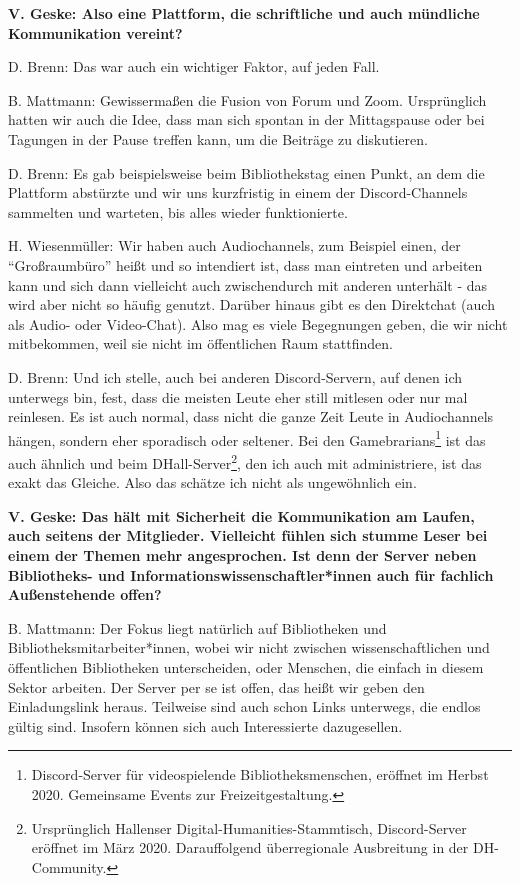 \documentclass[a4paper,
fontsize=11pt,
oneside,
numbers=noperiodatend,
parskip=half-,
bibliography=totoc,
final
]{scrartcl}
\begin{document}
\textbf{V. Geske: Also eine Plattform, die schriftliche und auch
mündliche Kommunikation vereint?}

D. Brenn: Das war auch ein wichtiger Faktor, auf jeden Fall.

B. Mattmann: Gewissermaßen die Fusion von Forum und Zoom. Ursprünglich
hatten wir auch die Idee, dass man sich spontan in der Mittagspause oder
bei Tagungen in der Pause treffen kann, um die Beiträge zu diskutieren.

D. Brenn: Es gab beispielsweise beim Bibliothekstag einen Punkt, an dem
die Plattform abstürzte und wir uns kurzfristig in einem der
Discord-Channels sammelten und warteten, bis alles wieder funktionierte.

H. Wiesenmüller: Wir haben auch Audiochannels, zum Beispiel einen, der
\enquote{Großraumbüro} heißt und so intendiert ist, dass man eintreten
und arbeiten kann und sich dann vielleicht auch zwischendurch mit
anderen unterhält - das wird aber nicht so häufig genutzt. Darüber
hinaus gibt es den Direktchat (auch als Audio- oder Video-Chat). Also
mag es viele Begegnungen geben, die wir nicht mitbekommen, weil sie
nicht im öffentlichen Raum stattfinden.

D. Brenn: Und ich stelle, auch bei anderen Discord-Servern, auf denen
ich unterwegs bin, fest, dass die meisten Leute eher still mitlesen oder
nur mal reinlesen. Es ist auch normal, dass nicht die ganze Zeit Leute
in Audiochannels hängen, sondern eher sporadisch oder seltener. Bei den
Gamebrarians\footnote{Discord-Server für videospielende
  Bibliotheksmenschen, eröffnet im Herbst 2020. Gemeinsame Events zur
  Freizeitgestaltung.} ist das auch ähnlich und beim
DHall-Server\footnote{Ursprünglich Hallenser
  Digital-Humanities-Stammtisch, Discord-Server eröffnet im März 2020.
  Darauffolgend überregionale Ausbreitung in der DH-Community.}, den ich
auch mit administriere, ist das exakt das Gleiche. Also das schätze ich
nicht als ungewöhnlich ein.

\textbf{V. Geske: Das hält mit Sicherheit die Kommunikation am Laufen,
auch seitens der Mitglieder. Vielleicht fühlen sich stumme Leser bei
einem der Themen mehr angesprochen. Ist denn der Server neben
Bibliotheks- und Informationswissenschaftler*innen auch für fachlich
Außenstehende offen?}

B. Mattmann: Der Fokus liegt natürlich auf Bibliotheken und
Bibliotheksmitarbeiter*innen, wobei wir nicht zwischen
wissenschaftlichen und öffentlichen Bibliotheken unterscheiden, oder
Menschen, die einfach in diesem Sektor arbeiten. Der Server per se ist
offen, das heißt wir geben den Einladungslink heraus. Teilweise sind
auch schon Links unterwegs, die endlos gültig sind. Insofern können sich
auch Interessierte dazugesellen.
\end{document}
